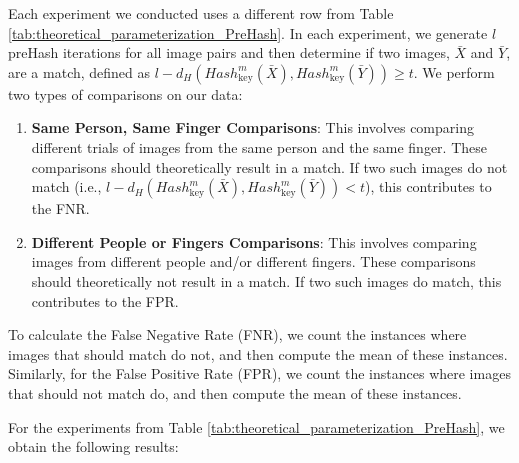 Each experiment we conducted uses a different row from Table \ref{tab:theoretical_parameterization_PreHash}. In each experiment, we generate \( l \) preHash iterations for all image pairs and then determine if two images, \(\bar{X}\) and \(\bar{Y}\), are a match, defined as \( l - d_H(Hash_{\text{key}}^m(\bar{X}), Hash_{\text{key}}^m(\bar{Y})) \geq t \). We perform two types of comparisons on our data:


\begin{enumerate}
    \item \textbf{Same Person, Same Finger Comparisons}: This involves comparing different trials of images from the same person and the same finger. These comparisons should theoretically result in a match. If two such images do not match (i.e., \( l - d_H(Hash_{\text{key}}^m(\bar{X}), Hash_{\text{key}}^m(\bar{Y})) < t \)), this contributes to the FNR.
    \item \textbf{Different People or Fingers Comparisons}: This involves comparing images from different people and/or different fingers. These comparisons should theoretically not result in a match. If two such images do match, this contributes to the FPR.
\end{enumerate}

To calculate the False Negative Rate (FNR), we count the instances where images that should match do not, and then compute the mean of these instances. Similarly, for the False Positive Rate (FPR), we count the instances where images that should not match do, and then compute the mean of these instances.

For the experiments from Table \ref{tab:theoretical_parameterization_PreHash}, we obtain the following results:

